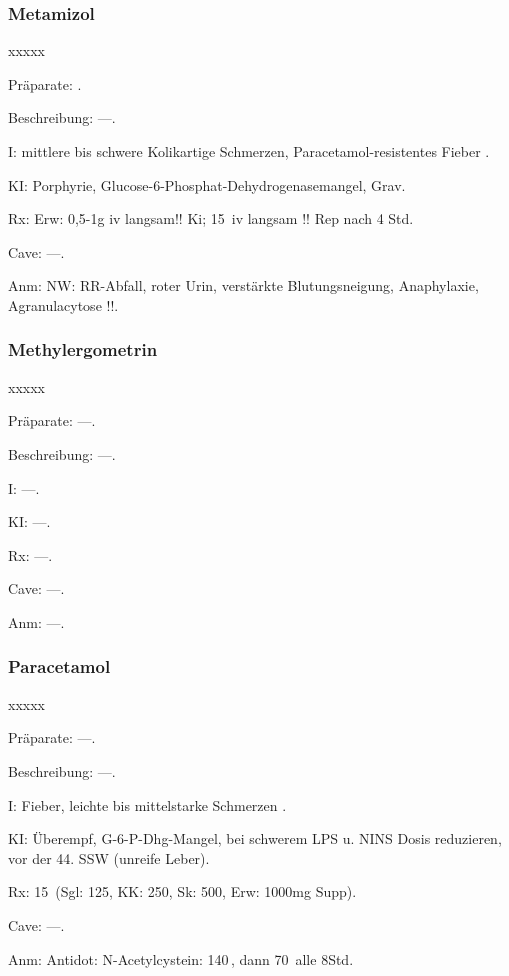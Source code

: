 \subsubsection{Metamizol}
\begin{labeling}[~]{xxxxx}
  \item[Präparate:]  .
  \item[Beschreibung:] ---.
  \item[I:]  mittlere bis schwere Kolikartige Schmerzen, Paracetamol-resistentes
Fieber .
  \item[KI:]   Porphyrie, Glucose-6-Phosphat-Dehydrogenasemangel, Grav.
  \item[Rx:]   Erw: 0,5-1g iv langsam!!\newline
Ki; 15\, iv langsam !!\newline
Rep nach 4 Std.
  \item[Cave:] ---.
  \item[Anm:]   NW: RR-Abfall, roter Urin, verstärkte Blutungsneigung, Anaphylaxie,
Agranulacytose !!.
\end{labeling}



\subsubsection{Methylergometrin}

\begin{labeling}[~]{xxxxx}
  \item[Präparate:]---.
  \item[Beschreibung:] ---.
  \item[I:] ---.
  \item[KI:] ---.
  \item[Rx:] ---.
  \item[Cave:] ---.
  \item[Anm:] ---.
\end{labeling}


\subsubsection{Paracetamol}

\begin{labeling}[~]{xxxxx}
  \item[Präparate:]---.
  \item[Beschreibung:] ---.
  \item[I:]  Fieber, leichte bis mittelstarke Schmerzen .
  \item[KI:]   Überempf, G-6-P-Dhg-Mangel, bei schwerem LPS u. NINS Dosis
reduzieren, vor der 44. SSW (unreife Leber).
  \item[Rx:]   15\, (Sgl: 125, KK: 250, Sk: 500, Erw: 1000mg Supp).
  \item[Cave:] ---.
  \item[Anm:]   Antidot: N-Acetylcystein: 140\,, dann 70\, alle 8Std.
\end{labeling}



